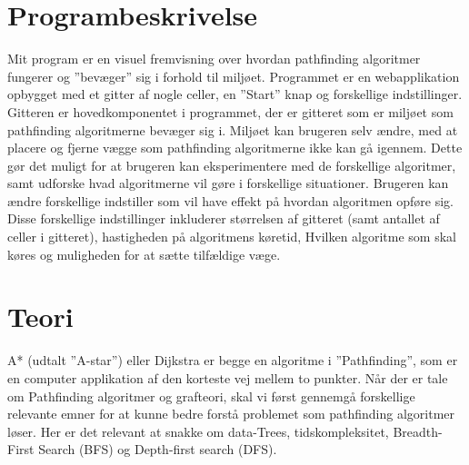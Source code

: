 \documentclass[12pt]{article}
\begin{document}
\section{Programbeskrivelse}
Mit program er en visuel fremvisning over hvordan pathfinding algoritmer fungerer og ”bevæger” sig i forhold til miljøet. Programmet er en webapplikation opbygget med et gitter af nogle celler, en ”Start” knap og forskellige indstillinger. 
Gitteren er hovedkomponentet i programmet, der er gitteret som er miljøet som pathfinding algoritmerne bevæger sig i. Miljøet kan brugeren selv ændre, med at placere og fjerne vægge som pathfinding algoritmerne ikke kan gå igennem. Dette gør det muligt for at brugeren kan eksperimentere med de forskellige algoritmer, samt udforske hvad algoritmerne vil gøre i forskellige situationer. Brugeren kan ændre forskellige indstiller som vil have effekt på hvordan algoritmen opføre sig. Disse forskellige indstillinger inkluderer størrelsen af gitteret (samt antallet af celler i gitteret), hastigheden på algoritmens køretid, Hvilken algoritme som skal køres og muligheden for at sætte tilfældige væge. 

\section{Teori}
A* (udtalt ”A-star”) eller Dijkstra er begge en algoritme i ”Pathfinding”, som er en computer applikation af den korteste vej mellem to punkter. Når der er tale om Pathfinding algoritmer og grafteori, skal vi først gennemgå forskellige relevante emner for at kunne bedre forstå problemet som pathfinding algoritmer løser. Her er det relevant at snakke om data-Trees, tidskompleksitet, Breadth-First Search (BFS) og Depth-first search (DFS). 
\end{document}
